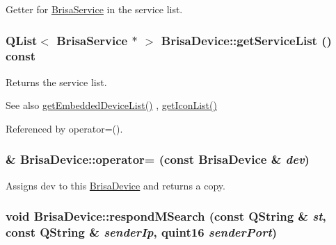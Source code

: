 Getter for \hyperlink{classBrisaUpnp_1_1BrisaService}{BrisaService} in the service list. \hypertarget{classBrisaUpnp_1_1BrisaDevice_aa1b0d798eaca84dd4edfdc9c0a8957c4}{
\subsubsection[{getServiceList}]{\setlength{\rightskip}{0pt plus 5cm}QList$<$ {\bf BrisaService} $\ast$ $>$ BrisaDevice::getServiceList () const}}
\label{classBrisaUpnp_1_1BrisaDevice_aa1b0d798eaca84dd4edfdc9c0a8957c4}


Returns the service list. \begin{DoxySeeAlso}{See also}
\hyperlink{classBrisaUpnp_1_1BrisaDevice_aca3708629a0be61fd39d551213557a71}{getEmbeddedDeviceList()} , \hyperlink{classBrisaUpnp_1_1BrisaDevice_a7263a7b99c2a4972d4a728f32ddd6e7d}{getIconList()} 
\end{DoxySeeAlso}


Referenced by operator=().\hypertarget{classBrisaUpnp_1_1BrisaDevice_a6b9c7e0a436761e3911ab80523f45c29}{
\subsubsection[{operator=}]{ \& BrisaDevice::operator= (const {\bf BrisaDevice} \& {\em dev})}}
\label{classBrisaUpnp_1_1BrisaDevice_a6b9c7e0a436761e3911ab80523f45c29}


Assigns dev to this \hyperlink{classBrisaUpnp_1_1BrisaDevice}{BrisaDevice} and returns a copy. \hypertarget{classBrisaUpnp_1_1BrisaDevice_a2119be091ea48002b30a21e1b23f347c}{
\subsubsection[{respondMSearch}]{\setlength{\rightskip}{0pt plus 5cm}void BrisaDevice::respondMSearch (const QString \& {\em st}, \/  const QString \& {\em senderIp}, \/  quint16 {\em senderPort})}}
\label{classBrisaUpnp_1_1BrisaDevice_a2119be091ea48002b30a21e1b23f347c}


